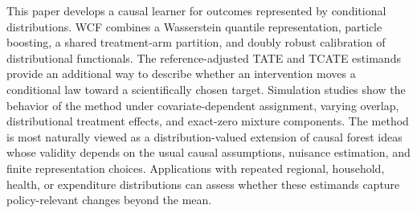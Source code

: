 This paper develops a causal learner for outcomes represented by conditional distributions. WCF combines a Wasserstein quantile representation, particle boosting, a shared treatment-arm partition, and doubly robust calibration of distributional functionals. The reference-adjusted TATE and TCATE estimands provide an additional way to describe whether an intervention moves a conditional law toward a scientifically chosen target. Simulation studies show the behavior of the method under covariate-dependent assignment, varying overlap, distributional treatment effects, and exact-zero mixture components. The method is most naturally viewed as a distribution-valued extension of causal forest ideas whose validity depends on the usual causal assumptions, nuisance estimation, and finite representation choices. Applications with repeated regional, household, health, or expenditure distributions can assess whether these estimands capture policy-relevant changes beyond the mean.
